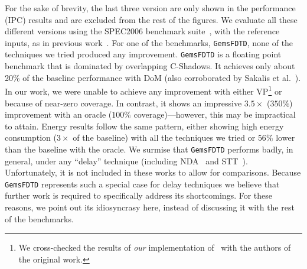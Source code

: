 For the sake of brevity, the last three version are only shown in the performance (IPC) results and are excluded from the rest of the figures.
We evaluate all these different versions using the SPEC2006 benchmark suite~\cite{spec:cpu06}, with the reference inputs, as in previous work~\cite{sakalis+:ISCA2019vp}.
For one of the benchmarks, \texttt{GemsFDTD}, none of the techniques we tried produced any improvement. \texttt{GemsFDTD} is a floating point benchmark that is dominated by overlapping C-Shadows.
It achieves only about 20\% of the baseline performance with DoM (also corroborated by Sakalis et al.~\cite{sakalis+:ISCA2019vp}).
In our work, we were unable to achieve any improvement with either VP\footnote{We cross-checked the results of \emph{our} implementation of~\cite{sakalis+:ISCA2019vp} with the authors of the original work.} 
or {\recomp} because of near-zero coverage. 
In contrast, it shows an impressive $3.5\times$ ($350\%$) improvement with an oracle {\recomp} ($100\%$ coverage)---however, this may be impractical to attain. 
Energy results follow the same pattern, either showing high energy consumption ($3\times$ of the baseline) with all the techniques we tried or $56\%$ lower than the baseline with the {\recomp} oracle.
We surmise that \texttt{GemsFDTD} performs badly, in general, under any ``delay'' technique (including NDA~\cite{weisse2019nda} and STT~\cite{yu_speculative:MICRO2019-STT}). 
Unfortunately, it is not included in these works to allow for comparisons. 
Because \texttt{GemsFDTD} represents such a special case for delay techniques we believe that further work is required to specifically address its shortcomings. 
For these reasons, we point out its idiosyncrasy here, instead of discussing it with the rest of the benchmarks.



